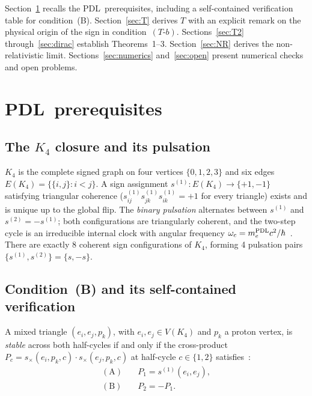 \documentclass[11pt,a4paper]{article}
\theoremstyle{definition}
\newcommand{\PDL}{\textnormal{PDL}}
\newcommand{\hb}{\hbar}
\newcommand{\mePDL}{m_e^{\PDL}}
\newcommand{\Kfour}{K_4}
\begin{document}
Section~\ref{sec:prereq} recalls the \PDL\ prerequisites, including a self-contained verification table for condition~(B). Section~\ref{sec:T} derives $T$ with an explicit remark on the physical origin of the sign in condition~$(T\textrm{-}b)$. Sections~\ref{sec:T2} through~\ref{sec:dirac} establish Theorems~1--3. Section~\ref{sec:NR} derives the non-relativistic limit. Sections~\ref{sec:numerics} and~\ref{sec:open} present numerical checks and open problems.

\section{\PDL\ prerequisites}
\label{sec:prereq}

\subsection{The \texorpdfstring{$K_4$}{K4} closure and its pulsation}

$\Kfour$ is the complete signed graph on four vertices $\{0,1,2,3\}$ and six edges $E(\Kfour) = \{\{i,j\} : i < j\}$. A sign assignment $s^{(1)} : E(\Kfour) \to \{+1,-1\}$ satisfying triangular coherence ($s^{(1)}_{ij} s^{(1)}_{jk} s^{(1)}_{ik} = +1$ for every triangle) exists and is unique up to the global flip. The \emph{binary pulsation} alternates between $s^{(1)}$ and $s^{(2)} = -s^{(1)}$; both configurations are triangularly coherent, and the two-step cycle is an irreducible internal clock with angular frequency $\omega_c = \mePDL c^2/\hb$~\cite{PDL_Main_2026}. There are exactly 8 coherent sign configurations of $\Kfour$, forming 4 pulsation pairs $\{s^{(1)}, s^{(2)}\} = \{s, -s\}$.

\subsection{Condition~(B) and its self-contained verification}
\label{subsec:condB}

A mixed triangle $(e_i, e_j, p_k)$, with $e_i, e_j \in V(\Kfour)$ and $p_k$ a proton vertex, is \emph{stable} across both half-cycles if and only if the cross-product $P_c = s_\times(e_i, p_k, c)\cdot s_\times(e_j, p_k, c)$ at half-cycle $c \in \{1,2\}$ satisfies~\cite{PDL_D29_2026}:
\begin{align}
\mathrm{(A)} &\quad P_1 = s^{(1)}(e_i, e_j), \label{eq:condA} \\
\mathrm{(B)} &\quad P_2 = -P_1. \label{eq:condB}
\end{align}
\end{document}
